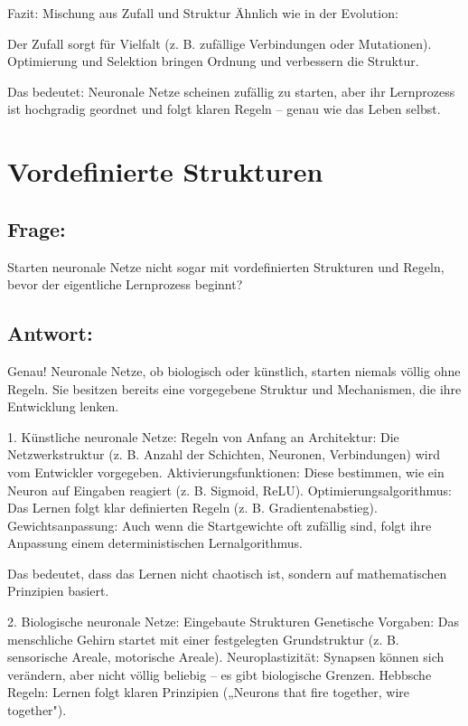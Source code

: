 \documentclass{article}
\begin{document}
	Fazit: Mischung aus Zufall und Struktur
	Ähnlich wie in der Evolution:
	
	Der Zufall sorgt für Vielfalt (z. B. zufällige Verbindungen oder Mutationen).
	Optimierung und Selektion bringen Ordnung und verbessern die Struktur.
	
	Das bedeutet: Neuronale Netze scheinen zufällig zu starten, aber ihr Lernprozess ist hochgradig geordnet und folgt klaren Regeln – genau wie das Leben selbst.
	
	\section{Vordefinierte Strukturen}
	
	\subsection*{Frage:}
	Starten neuronale Netze nicht sogar mit vordefinierten Strukturen und Regeln, bevor der eigentliche Lernprozess beginnt?
	
	\subsection*{Antwort:}
	Genau! Neuronale Netze, ob biologisch oder künstlich, starten niemals völlig ohne Regeln. Sie besitzen bereits eine vorgegebene Struktur und Mechanismen, die ihre Entwicklung lenken.
	
	1. Künstliche neuronale Netze: Regeln von Anfang an
	Architektur: Die Netzwerkstruktur (z. B. Anzahl der Schichten, Neuronen, Verbindungen) wird vom Entwickler vorgegeben.
	Aktivierungsfunktionen: Diese bestimmen, wie ein Neuron auf Eingaben reagiert (z. B. Sigmoid, ReLU).
	Optimierungsalgorithmus: Das Lernen folgt klar definierten Regeln (z. B. Gradientenabstieg).
	Gewichtsanpassung: Auch wenn die Startgewichte oft zufällig sind, folgt ihre Anpassung einem deterministischen Lernalgorithmus.
	
	Das bedeutet, dass das Lernen nicht chaotisch ist, sondern auf mathematischen Prinzipien basiert.
	
	2. Biologische neuronale Netze: Eingebaute Strukturen
	Genetische Vorgaben: Das menschliche Gehirn startet mit einer festgelegten Grundstruktur (z. B. sensorische Areale, motorische Areale).
	Neuroplastizität: Synapsen können sich verändern, aber nicht völlig beliebig – es gibt biologische Grenzen.
	Hebbsche Regeln: Lernen folgt klaren Prinzipien („Neurons that fire together, wire together").
	
\end{document}
